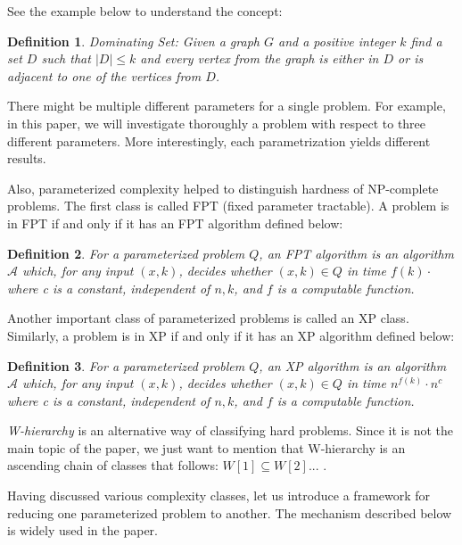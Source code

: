 \documentclass[en]{pracamgr}
\newtheorem{definition}{Definition}
\newcommand{\domsetp}{{\sc Dominating Set}}
\begin{document}
See the example below to understand the concept:

\begin{definition}
	\domsetp{}: Given a graph $G$ and a positive integer $k$ find a set $D$ such that $|D| \leq k$ and every vertex from the graph is either in $D$ or is adjacent to one of the vertices from $D$.
\end{definition}

There might be multiple different parameters for a single problem. For example, in this paper, we will investigate thoroughly a problem with respect to three different parameters. More interestingly, each parametrization yields different results. 

Also, parameterized complexity helped to distinguish hardness of NP-complete problems. The first class is called FPT (fixed parameter tractable). A problem is in FPT if and only if it has an FPT algorithm defined below:

\begin{definition}\label{FPT algorithm}
	For a parameterized problem $Q$, an \textup{FPT algorithm} is an algorithm $\mathcal{A}$ which, for any input $(x,k)$, decides whether $(x,k) \in Q$ in time $f(k)\cdot $ where c is a constant, independent of $n,k$, and $f$ is a computable function.
\end{definition}

Another important class of parameterized problems is called an XP class. Similarly, a problem is in XP if and only if it has an XP algorithm defined below:

\begin{definition}
	For a parameterized problem $Q$, an \textup{XP algorithm} is an algorithm $\mathcal{A}$ which, for any input $(x,k)$, decides whether $(x,k) \in Q$ in time $n^{f(k)}\cdot n^c$ where c is a constant, independent of $n,k$, and $f$ is a computable function.
\end{definition}

\emph{W-hierarchy} is an alternative way of classifying hard problems. Since it is not the main topic of the paper, we just want to mention that W-hierarchy is an ascending chain of classes that follows: $W[1] \subseteq W[2]...$ . 

Having discussed various complexity classes, let us introduce a framework for reducing one parameterized problem to another. The mechanism described below is widely used in the paper.
\end{document}
